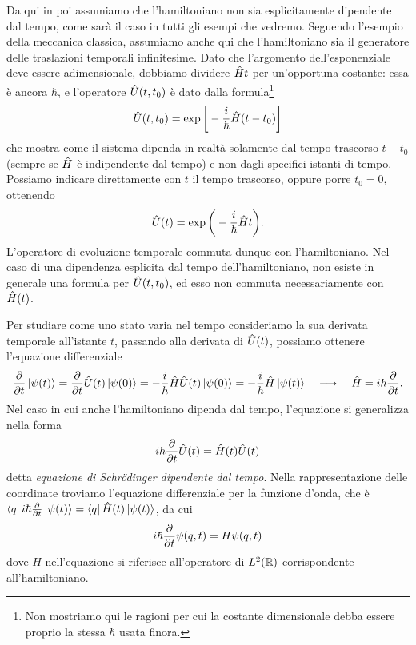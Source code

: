 Da qui in poi assumiamo che l'hamiltoniano non sia esplicitamente dipendente dal tempo, come sarà il caso in tutti gli esempi che vedremo.
Seguendo l'esempio della meccanica classica, assumiamo anche qui che l'hamiltoniano sia il generatore delle traslazioni temporali infinitesime.
Dato che l'argomento dell'esponenziale deve essere adimensionale, dobbiamo dividere $\hat{H}t$ per un'opportuna costante: essa è ancora $\hbar$, e l'operatore $\hat{U}(t,t_0)$ è dato dalla formula\footnote{Non mostriamo qui le ragioni per cui la costante dimensionale debba essere proprio la stessa $\hbar$ usata finora.}
\begin{equation}
	\hat{U}(t,t_0)=\exp\bigg[-\frac{i}{\hbar}\hat{H}(t-t_0)\bigg]
	\label{eq:operatore-evoluzione-temporale}
\end{equation}
che mostra come il sistema dipenda in realtà solamente dal tempo trascorso $t-t_0$ (sempre se $\hat{H}$ è indipendente dal tempo) e non dagli specifici istanti di tempo.
Possiamo indicare direttamente con $t$ il tempo trascorso, oppure porre $t_0=0$, ottenendo
\begin{equation}
	\hat{U}(t)=\exp\bigg(-\frac{i}{\hbar}\hat{H}t\bigg).
\end{equation}
L'operatore di evoluzione temporale commuta dunque con l'hamiltoniano.
Nel caso di una dipendenza esplicita dal tempo dell'hamiltoniano, non esiste in generale una formula per $\hat{U}(t,t_0)$, ed esso non commuta necessariamente con $\hat{H}(t)$.

Per studiare come uno stato varia nel tempo consideriamo la sua derivata temporale all'istante $t$, passando alla derivata di $\hat{U}(t)$, possiamo ottenere l'equazione differenziale
\begin{equation}
	\frac{\partial {}}{\partial {t}}\left|{\psi(t)}\right\rangle=\frac{\partial {}}{\partial {t}}\hat{U}(t)\left|{\psi(0)}\right\rangle=-\frac{i}{\hbar}\hat{H}\hat{U}(t)\left|{\psi(0)}\right\rangle=-\frac{i}{\hbar}\hat{H}\left|{\psi(t)}\right\rangle\quad\longrightarrow\quad \hat{H}=i\hbar\frac{\partial {}}{\partial {t}}.
\end{equation}
Nel caso in cui anche l'hamiltoniano dipenda dal tempo, l'equazione si generalizza nella forma
\begin{equation}
	i\hbar\frac{\partial {}}{\partial {t}}\hat{U}(t)=\hat{H}(t)\hat{U}(t)
	\label{eq:schrodinger-tempo}
\end{equation}
detta \emph{equazione di Schr\"odinger dipendente dal tempo}.
Nella rappresentazione delle coordinate troviamo l'equazione differenziale per la funzione d'onda, che è $\left\langle{q}\right|i\hbar\frac{\partial {}}{\partial {t}}\left|{\psi(t)}\right\rangle=\left\langle{q}\right|\hat{H}(t)\left|{\psi(t)}\right\rangle$, da cui
\begin{equation}
	i\hbar\frac{\partial {}}{\partial {t}}\psi(q,t)=H\psi(q,t)
	\label{eq:schrodinger-tempo-coordinate}
\end{equation}
dove $H$ nell'equazione si riferisce all'operatore di $L^2(\mathbb{R})$ corrispondente all'hamiltoniano.

